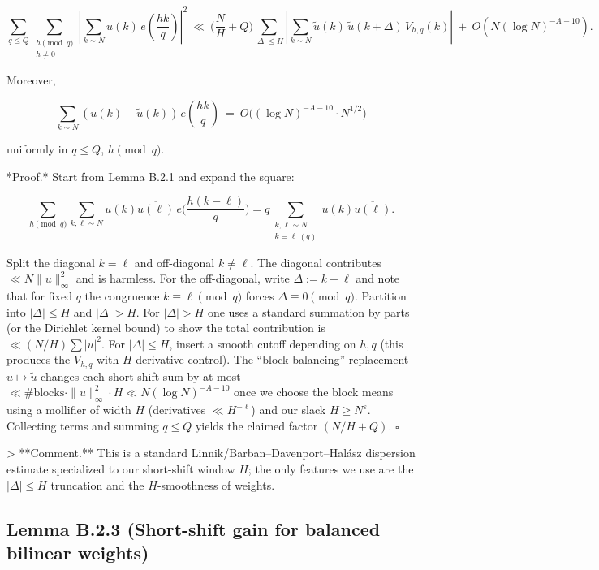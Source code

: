 \documentclass[11pt]{article}
\theoremstyle{definition}
\theoremstyle{remark}
\begin{document}
$$
\sum_{q\le Q}\sum_{\substack{h\!\!\!\pmod q\\ h\neq 0}}
\left|\sum_{k\sim N} u(k)\,e\!\left(\frac{hk}{q}\right)\right|^2
\ \ll\ \Big(\frac{N}{H}+Q\Big)\!
\sum_{|\Delta|\le H}\left|\sum_{k\sim N}\widetilde{u}(k)\,\overline{\widetilde{u}(k+\Delta)}\,V_{h,q}(k)\right|
\ +\ O\!\left(N(\log N)^{-A-10}\right).
$$

Moreover,

$$
\sum_{k\sim N} \left(u(k)-\widetilde{u}(k)\right)\,e\!\left(\frac{hk}{q}\right)
\ =\ O\!\big((\log N)^{-A-10}\cdot N^{1/2}\big)
$$

uniformly in $q\le Q$, $h\pmod q$.

*Proof.* Start from Lemma B.2.1 and expand the square:

$$
\sum_{h\!\!\!\pmod q} \sum_{k,\ell\sim N} u(k)\overline{u(\ell)}\,e\!\Big(\frac{h(k-\ell)}{q}\Big)
= q\!\!\sum_{\substack{k,\ell\sim N\\ k\equiv \ell\ (q)}} u(k)\overline{u(\ell)}.
$$

Split the diagonal $k=\ell$ and off-diagonal $k\ne \ell$. The diagonal contributes $\ll N\|u\|_\infty^2$ and is harmless. For the off-diagonal, write $\Delta:=k-\ell$ and note that for fixed $q$ the congruence $k\equiv \ell \pmod q$ forces $\Delta\equiv 0\pmod q$. Partition into $|\Delta|\le H$ and $|\Delta|>H$. For $|\Delta|>H$ one uses a standard summation by parts (or the Dirichlet kernel bound) to show the total contribution is $\ll (N/H)\sum |u|^2$. For $|\Delta|\le H$, insert a smooth cutoff depending on $h,q$ (this produces the $V_{h,q}$ with $H$-derivative control). The “block balancing” replacement $u\mapsto \widetilde{u}$ changes each short-shift sum by at most $\ll \#\text{blocks}\cdot \|u\|_\infty^2 \cdot H \ll N(\log N)^{-A-10}$ once we choose the block means using a mollifier of width $H$ (derivatives $\ll H^{-\ell}$) and our slack $H\ge N^{\varepsilon}$. Collecting terms and summing $q\le Q$ yields the claimed factor $(N/H+Q)$. $\square$

> **Comment.** This is a standard Linnik/Barban–Davenport–Halász dispersion estimate specialized to our short-shift window $H$; the only features we use are the $|\Delta|\le H$ truncation and the $H$-smoothness of weights.

\subsection*{Lemma B.2.3 (Short-shift gain for balanced bilinear weights)}
\end{document}
